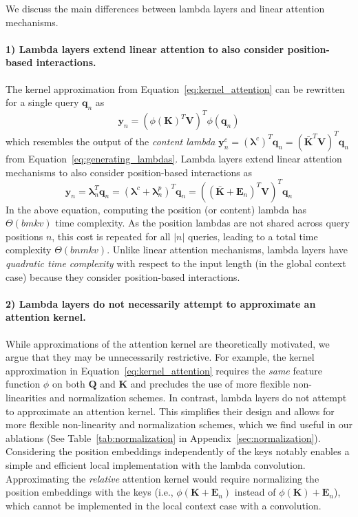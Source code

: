 \documentclass{article} \usepackage{iclr2021_conference,times}
\begin{document}
We discuss the main differences between lambda layers and linear attention mechanisms.

\paragraph{1) Lambda layers extend linear attention to also consider position-based interactions.}
The kernel approximation from Equation~\ref{eq:kernel_attention} can be rewritten for a single query $\boldsymbol{q}_n$ as
\begin{equation}
    \label{eq:kernel_attention_single_query}
    \boldsymbol{y}_n = (\phi(\boldsymbol{K})^T \boldsymbol{V})^T\phi(\boldsymbol{q}_n)
\end{equation}
which resembles the output of the \emph{content lambda} $\boldsymbol{y}_n^c = (\boldsymbol{\lambda}^c)^T \boldsymbol{q}_n = (\boldsymbol{\bar{K}}^T \boldsymbol{V})^T \boldsymbol{q}_n$ from Equation~\ref{eq:generating_lambdas}.
Lambda layers extend linear attention mechanisms to also consider position-based interactions as
\begin{equation}
    \label{eq:lambda_complete}
    \boldsymbol{y}_n = \boldsymbol{\lambda}_n^T \boldsymbol{q}_n = (\boldsymbol{\lambda}^c + \boldsymbol{\lambda}_n^p)^T \boldsymbol{q}_n = ((\boldsymbol{\bar{K}}+\boldsymbol{E}_n)^T\boldsymbol{V})^T\boldsymbol{q}_n
\end{equation}
In the above equation, computing the position (or content) lambda has $\Theta(bmkv)$ time complexity.
As the position lambdas are not shared across query positions $n$, this cost is repeated for all $|n|$ queries, leading to a total time complexity $\Theta(bnmkv)$.
Unlike linear attention mechanisms, lambda layers have \emph{quadratic time complexity} with respect to the input length (in the global context case) because they consider position-based interactions.

\paragraph{2) Lambda layers do not necessarily attempt to approximate an attention kernel.}
While approximations of the attention kernel are theoretically motivated, we argue that they may be unnecessarily restrictive.
For example, the kernel approximation in Equation~\ref{eq:kernel_attention} requires the \emph{same} feature function $\phi$ on both $\boldsymbol{Q}$ and $\boldsymbol{K}$ and precludes the use of more flexible non-linearities and normalization schemes.
In contrast, lambda layers do not attempt to approximate an attention kernel.
This simplifies their design and allows for more flexible non-linearity and normalization schemes, which we find useful in our ablations (See Table~\ref{tab:normalization} in Appendix~\ref{sec:normalization}).
Considering the position embeddings independently of the keys notably enables a simple and efficient local implementation with the lambda convolution.
Approximating the \emph{relative} attention kernel would require normalizing the position embeddings with the keys (i.e., $\phi(\boldsymbol{K} + \boldsymbol{E}_n)$ instead of $\phi(\boldsymbol{K}) + \boldsymbol{E}_n$), which cannot be implemented in the local context case with a convolution.
\end{document}
